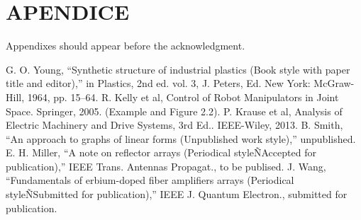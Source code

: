 \documentclass[a4paper, 10pt, journal]{ieeeconf}
\begin{document}
\section*{APENDICE}

Appendixes should appear before the acknowledgment.

\begin{thebibliography}{99}

 G. O. Young, ``Synthetic structure of industrial plastics (Book style with paper title and editor),'' 	in Plastics, 2nd ed. vol. 3, J. Peters, Ed.  New York: McGraw-Hill, 1964, pp. 15--64.
 R. Kelly et al, Control of Robot Manipulators in Joint Space. Springer, 2005. (Example and Figure 2.2).
 P. Krause et al, Analysis of Electric Machinery and Drive Systems, 3rd Ed.. IEEE-Wiley, 2013.
 B. Smith, ``An approach to graphs of linear forms (Unpublished work style),'' unpublished.
 E. H. Miller, ``A note on reflector arrays (Periodical styleÑAccepted for publication),'' IEEE Trans. Antennas Propagat., to be publised.
 J. Wang, ``Fundamentals of erbium-doped fiber amplifiers arrays (Periodical styleÑSubmitted for publication),'' IEEE J. Quantum Electron., submitted for publication.

\end{thebibliography}
\end{document}
